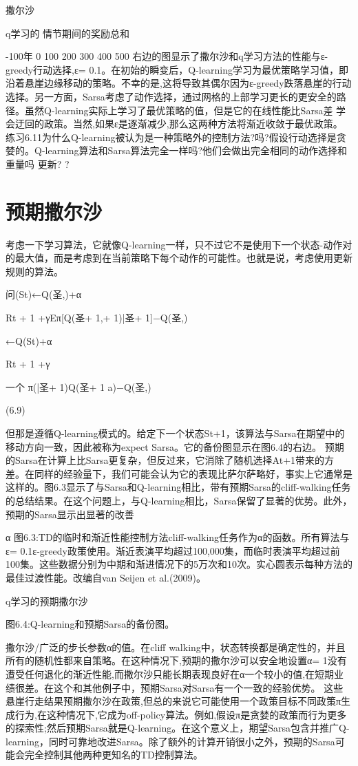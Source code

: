 撒尔沙

q学习的
情节期间的奖励总和

-100年
0 100 200 300 400 500
右边的图显示了撒尔沙和q学习方法的性能与ε-greedy行动选择,ε= 0.1。在初始的瞬变后，Q-learning学习为最优策略学习值，即沿着悬崖边缘移动的策略。不幸的是,这将导致其偶尔因为ε-greedy跌落悬崖的行动选择。另一方面，Sarsa考虑了动作选择，通过网格的上部学习更长的更安全的路径。虽然Q-learning实际上学习了最优策略的值，但是它的在线性能比Sarsa差
学会迂回的政策。当然,如果ε是逐渐减少,那么这两种方法将渐近收敛于最优政策。
练习6.11为什么Q-learning被认为是一种策略外的控制方法?吗?假设行动选择是贪婪的。Q-learning算法和Sarsa算法完全一样吗?他们会做出完全相同的动作选择和重量吗
更新? 					?
\section{预期撒尔沙}

考虑一下学习算法，它就像Q-learning一样，只不过它不是使用下一个状态-动作对的最大值，而是考虑到在当前策略下每个动作的可能性。也就是说，考虑使用更新规则的算法。

问(St)←Q(圣,)+α

Rt + 1 +γEπ[Q(圣+ 1,+ 1)|圣+ 1]−Q(圣,)

←Q(St)+α

Rt + 1 +γ

一个
π(|圣+ 1)Q(圣+ 1 a)−Q(圣,)

(6.9)


但那是遵循Q-learning模式的。给定下一个状态St+1，该算法与Sarsa在期望中的移动方向一致，因此被称为expect Sarsa。它的备份图显示在图6.4的右边。
预期的Sarsa在计算上比Sarsa更复杂，但反过来，它消除了随机选择At+1带来的方差。在同样的经验量下，我们可能会认为它的表现比萨尔萨略好，事实上它通常是这样的。图6.3显示了与Sarsa和Q-learning相比，带有预期Sarsa的cliff-walking任务的总结结果。在这个问题上，与Q-learning相比，Sarsa保留了显著的优势。此外，预期的Sarsa显示出显著的改善
 
α
图6.3:TD的临时和渐近性能控制方法cliff-walking任务作为α的函数。所有算法与ε= 0.1ε-greedy政策使用。渐近表演平均超过100,000集，而临时表演平均超过前100集。这些数据分别为中期和渐进情况下的5万次和10次。实心圆表示每种方法的最佳过渡性能。改编自van Seijen et al.(2009)。

q学习的预期撒尔沙

图6.4:Q-learning和预期Sarsa的备份图。



撒尔沙/广泛的步长参数α的值。在cliff walking中，状态转换都是确定性的，并且所有的随机性都来自策略。在这种情况下,预期的撒尔沙可以安全地设置α= 1没有遭受任何退化的渐近性能,而撒尔沙只能长期表现良好在α一个较小的值,在短期业绩很差。在这个和其他例子中，预期Sarsa对Sarsa有一个一致的经验优势。
这些悬崖行走结果预期撒尔沙在政策,但总的来说它可能使用一个政策目标不同政策π生成行为,在这种情况下,它成为off-policy算法。例如,假设π是贪婪的政策而行为更多的探索性;然后预期Sarsa就是Q-learning。在这个意义上，期望Sarsa包含并推广Q-learning，同时可靠地改进Sarsa。除了额外的计算开销很小之外，预期的Sarsa可能会完全控制其他两种更知名的TD控制算法。


